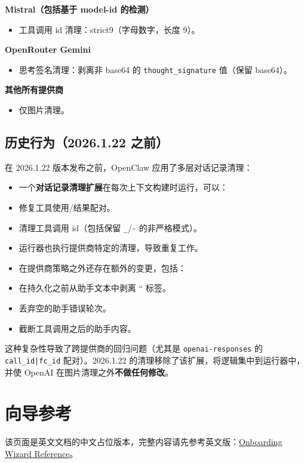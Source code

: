 \textbf{Mistral（包括基于 model-id 的检测）}

\begin{itemize}
  \item 工具调用 id 清理：strict9（字母数字，长度 9）。
\end{itemize}


\textbf{OpenRouter Gemini}

\begin{itemize}
  \item 思考签名清理：剥离非 base64 的 \texttt{thought\_signature} 值（保留 base64）。
\end{itemize}


\textbf{其他所有提供商}

\begin{itemize}
  \item 仅图片清理。
\end{itemize}


\hrulefill


\subsection{历史行为（2026.1.22 之前）}


在 2026.1.22 版本发布之前，OpenClaw 应用了多层对话记录清理：

\begin{itemize}
  \item 一个\textbf{对话记录清理扩展}在每次上下文构建时运行，可以：
  \item 修复工具使用/结果配对。
  \item 清理工具调用 id（包括保留 \texttt{\_}/\texttt{-} 的非严格模式）。
  \item 运行器也执行提供商特定的清理，导致重复工作。
  \item 在提供商策略之外还存在额外的变更，包括：
  \item 在持久化之前从助手文本中剥离 `` 标签。
  \item 丢弃空的助手错误轮次。
  \item 截断工具调用之后的助手内容。
\end{itemize}


这种复杂性导致了跨提供商的回归问题（尤其是 \texttt{openai-responses} 的 \texttt{call\_id|fc\_id} 配对）。2026.1.22 的清理移除了该扩展，将逻辑集中到运行器中，并使 OpenAI 在图片清理之外\textbf{不做任何修改}。


\clearpage

\section{向导参考}


该页面是英文文档的中文占位版本，完整内容请先参考英文版：\href{/reference/wizard}{Onboarding Wizard Reference}。


\clearpage
